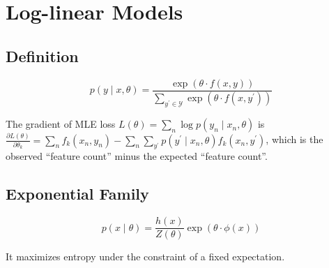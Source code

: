 \section{Log-linear Models}

\subsection*{Definition}
$$p(y\mid x, \theta)  = \frac{\exp(\theta\cdot f(x,y))}{\sum_{y^\prime \in \mathcal{Y}}\exp(\theta\cdot f(x,y^\prime))}$$

The gradient of MLE loss $L(\theta)=\sum_{n} \log p(y_n\mid x_n, \theta)$ is
$\frac{\partial L(\theta)}{\partial \theta_k} = \sum_{n} f_k(x_n, y_n) - \sum_n \sum_{y^\prime} p(y^\prime\mid x_n, \theta)f_k(x_n, y^\prime)$, which is the observed ``feature count'' minus the expected ``feature count''.

\subsection*{Exponential Family}
$$p(x\mid \theta) = \frac{h(x)}{Z(\theta)} \exp(\theta\cdot \phi(x))$$

It maximizes entropy under the constraint of a fixed expectation.